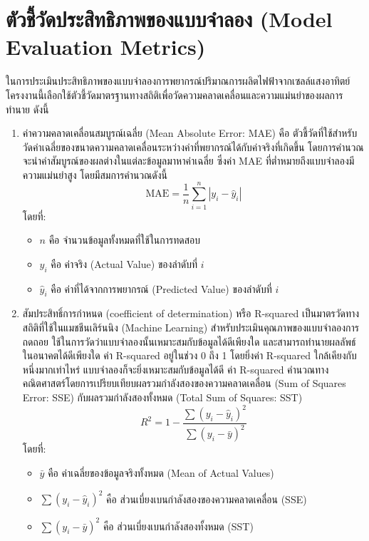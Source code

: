 \section{ตัวชี้วัดประสิทธิภาพของแบบจำลอง (Model Evaluation Metrics) }
\hspace{\parindent}ในการประเมินประสิทธิภาพของแบบจำลองการพยากรณ์ปริมาณการผลิตไฟฟ้าจากเซลล์แสงอาทิตย์ โครงงานนี้เลือกใช้ตัวชี้วัดมาตรฐานทางสถิติเพื่อวัดความคลาดเคลื่อนและความแม่นยำของผลการทำนาย ดังนี้
\begin{enumerate}
  \item ค่าความคลาดเคลื่อนสมบูรณ์เฉลี่ย (Mean Absolute Error: MAE) 
  คือ ตัวชี้วัดที่ใช้สำหรับวัดค่าเฉลี่ยของขนาดความคลาดเคลื่อนระหว่างค่าที่พยากรณ์ได้กับค่าจริงที่เกิดขึ้น โดยการคำนวณจะนำค่าสัมบูรณ์ของผลต่างในแต่ละข้อมูลมาหาค่าเฉลี่ย ซึ่งค่า MAE ที่ต่ำหมายถึงแบบจำลองมีความแม่นยำสูง โดยมีสมการคำนวณดังนี้
  \begin{equation}
  \text{MAE} = \frac{1}{n} \sum_{i=1}^{n} |y_i - \hat{y}_i|
  \end{equation}
  \noindent โดยที่:
  \begin{itemize}
  \item $n$ คือ จำนวนข้อมูลทั้งหมดที่ใช้ในการทดสอบ
  \item $y_i$ คือ ค่าจริง (Actual Value) ของลำดับที่ $i$
  \item $\hat{y}_i$ คือ ค่าที่ได้จากการพยากรณ์ (Predicted Value) ของลำดับที่ $i$
  \end{itemize}

  \item สัมประสิทธิ์การกำหนด (coefficient of determination) หรือ R-squared เป็นมาตรวัดทางสถิติที่ใช้ในแมชชีนเลิร์นนิง (Machine Learning) สำหรับประเมินคุณภาพของแบบจำลองการถดถอย ใช้ในการวัดว่าแบบจำลองนั้นเหมาะสมกับข้อมูลได้ดีเพียงใด และสามารถทำนายผลลัพธ์ในอนาคตได้ดีเพียงใด
  ค่า R-squared อยู่ในช่วง 0 ถึง 1 โดยยิ่งค่า R-squared ใกล้เคียงกับหนึ่งมากเท่าไหร่ แบบจำลองก็จะยิ่งเหมาะสมกับข้อมูลได้ดี
  ค่า R-squared คำนวณทางคณิตศาสตร์โดยการเปรียบเทียบผลรวมกำลังสองของความคลาดเคลื่อน (Sum of Squares Error: SSE) กับผลรวมกำลังสองทั้งหมด (Total Sum of Squares: SST)
  \begin{equation}R^2 = 1 - \frac{\sum (y_i - \hat{y}_i)^2}{\sum (y_i - \bar{y})^2}
  \end{equation}
  \noindent โดยที่:
  \begin{itemize}\item $\bar{y}$ คือ ค่าเฉลี่ยของข้อมูลจริงทั้งหมด (Mean of Actual Values)
    \item $\sum (y_i - \hat{y}_i)^2$ คือ ส่วนเบี่ยงเบนกำลังสองของความคลาดเคลื่อน (SSE)
    \item $\sum (y_i - \bar{y})^2$ คือ ส่วนเบี่ยงเบนกำลังสองทั้งหมด (SST)
  \end{itemize}
  \cite{arize_rsquared}\cite{deepchecks_mae}\cite{devto_metrics}

  \end{enumerate}
